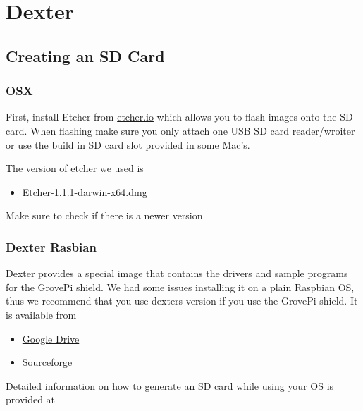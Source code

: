 

\chapter{Dexter}\label{dexter}

\FILENAME

\section{Creating an SD Card}\label{creating-an-sd-card}

\subsection{OSX}\label{osx}

First, install Etcher from \href{https://etcher.io/}{etcher.io} which
allows you to flash images onto the SD card. When flashing make sure you
only attach one USB SD card reader/wroiter or use the build in SD card
slot provided in some Mac's.

The version of etcher we used is

\begin{itemize}
\item
  \href{https://github.com/resin-io/etcher/releases/download/v1.1.1/Etcher-1.1.1-darwin-x64.dmg}{Etcher-1.1.1-darwin-x64.dmg}
\end{itemize}

Make sure to check if there is a newer version

\subsection{Dexter Rasbian}\label{dexter-rasbian}

Dexter provides a special image that contains the drivers and sample
programs for the GrovePi shield. We had some issues installing it on a
plain Raspbian OS, thus we recommend that you use dexters version if you
use the GrovePi shield. It is available from

\begin{itemize}
\item
  \href{http://sourceforge.net/projects/dexterindustriesraspbianflavor/}{Google
  Drive}
\item
  \href{http://sourceforge.net/projects/dexterindustriesraspbianflavor/}{Sourceforge}
\end{itemize}

Detailed information on how to generate an SD card while using your OS
is provided at


